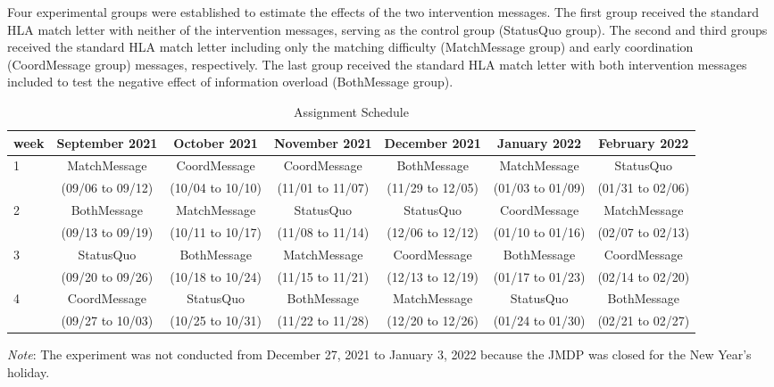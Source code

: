 \documentclass[12pt, a4paper]{article}
\begin{document}
Four experimental groups were established to estimate the effects of the two intervention messages. The first group received the standard HLA match letter with neither of the intervention messages, serving as the control group (StatusQuo group). The second and third groups received the standard HLA match letter including only the matching difficulty (MatchMessage group) and early coordination (CoordMessage group) messages, respectively. The last group received the standard HLA match letter with both intervention messages included to test the negative effect of information overload (BothMessage group).

\begin{table}
\centering
\caption{\label{tab:assignment}Assignment Schedule}
\centering
\fontsize{8}{10}\selectfont
\begin{threeparttable}
\begin{tabular}[t]{lcccccc}
\toprule
week & September 2021 & October 2021 & November 2021 & December 2021 & January 2022 & February 2022\\
\midrule
1 & MatchMessage & CoordMessage & CoordMessage & BothMessage & MatchMessage & StatusQuo\\
 & (09/06 to 09/12) & (10/04 to 10/10) & (11/01 to 11/07) & (11/29 to 12/05) & (01/03 to 01/09) & (01/31 to 02/06)\\
2 & BothMessage & MatchMessage & StatusQuo & StatusQuo & CoordMessage & MatchMessage\\
 & (09/13 to 09/19) & (10/11 to 10/17) & (11/08 to 11/14) & (12/06 to 12/12) & (01/10 to 01/16) & (02/07 to 02/13)\\
3 & StatusQuo & BothMessage & MatchMessage & CoordMessage & BothMessage & CoordMessage\\
 & (09/20 to 09/26) & (10/18 to 10/24) & (11/15 to 11/21) & (12/13 to 12/19) & (01/17 to 01/23) & (02/14 to 02/20)\\
4 & CoordMessage & StatusQuo & BothMessage & MatchMessage & StatusQuo & BothMessage\\
 & (09/27 to 10/03) & (10/25 to 10/31) & (11/22 to 11/28) & (12/20 to 12/26) & (01/24 to 01/30) & (02/21 to 02/27)\\
\bottomrule
\end{tabular}
\begin{tablenotes}
\item \emph{Note}: The experiment was not conducted from December 27, 2021 to January 3, 2022 because the JMDP was closed for the New Year's holiday.
\end{tablenotes}
\end{threeparttable}
\end{table}
\end{document}
